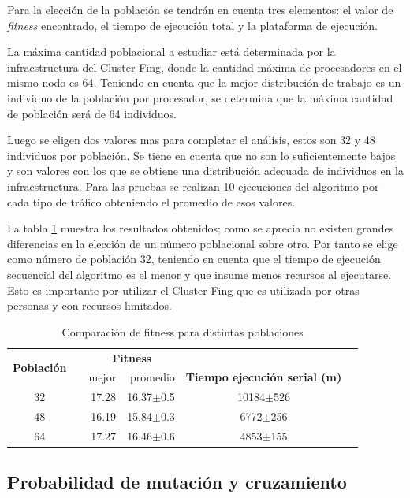 Para la elección de la población se tendrán en cuenta tres elementos: el valor de \emph{fitness} encontrado, el tiempo de ejecución total y la plataforma de ejecución.

La máxima cantidad poblacional a estudiar está determinada por la infraestructura del Cluster Fing, donde la cantidad máxima de procesadores en el mismo nodo es 64. Teniendo en cuenta que la mejor distribución de trabajo es un individuo de la población por procesador, se determina que la máxima cantidad de población será de 64 individuos.

Luego se eligen dos valores mas para completar el análisis, estos son 32 y 48 individuos por población. Se tiene en cuenta que no son lo suficientemente bajos y son valores con los que se obtiene una distribución adecuada de individuos en la infraestructura. Para las pruebas se realizan 10 ejecuciones del algoritmo por cada tipo de tráfico obteniendo el promedio de esos valores.

La tabla \ref{table:parametro_poblacion} muestra los resultados obtenidos; como se aprecia no existen grandes diferencias en la elección de un número poblacional sobre otro. Por tanto se elige como número de población 32, teniendo en cuenta que el tiempo de ejecución secuencial del algoritmo es el menor y que insume menos recursos al ejecutarse. Esto es importante por utilizar el Cluster Fing que es utilizada por otras personas y con recursos limitados.

\begin{table}[h]
	\renewcommand{\arraystretch}{1.2}
	\caption{Comparación de fitness para distintas poblaciones}
	\label{table:parametro_poblacion}
	\centering
	\begin{tabular}{ccrrcp{2cm}}
		\hline
	    \multirow{2}{*}{\textbf{Población}}& & 
		\multicolumn{2}{c}{\textbf{Fitness}} \\
		\cline{3-4}
		& & {mejor} 
		& {promedio} 
		& \textbf{Tiempo ejecución serial (m)} \\
		\hline
		32 & & {17.28} & 16.37$\pm$0.5 & 10184$\pm$526\\
		48 & & {16.19} & 15.84$\pm$0.3 & 6772$\pm$256\\
		64 & & {17.27} & 16.46$\pm$0.6 & 4853$\pm$155\\
		\hline
	\end{tabular}
\end{table}





\subsection{Probabilidad de mutación y cruzamiento}

